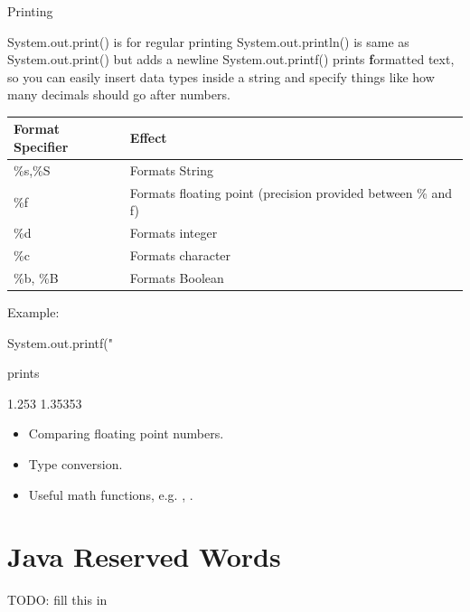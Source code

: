 Printing

System.out.print() is for regular printing
System.out.println() is same as System.out.print() but adds a newline
System.out.printf() prints \textbf{f}ormatted text, so you can easily insert data types inside a string and specify things like how many decimals should go after numbers. 
\begin{tabular}{|l|l|}
\hline
Format Specifier & Effect\\
\hline
\%s,\%S & Formats String\\
\%f & Formats floating point (precision provided between \% and f)\\
\%d & Formats integer\\
\%c & Formats character\\
\%b, \%B & Formats Boolean\\
\hline
\end{tabular}

Example: 

\begin{code}
System.out.printf("%
\end{code}

prints 

\begin{code}
1.253
1.35353
\end{code}



\begin{itemize}

	\item Comparing floating point numbers.
	\item Type conversion.
	\item Useful math functions, e.g. , .

\end{itemize}

\section{Java Reserved Words}

TODO: fill this in